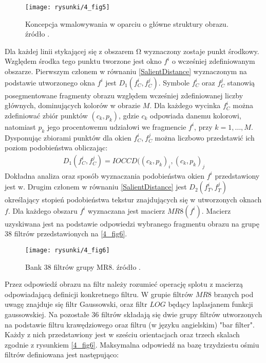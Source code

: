 \documentclass[12pt, twoside, openany]{report}
\theoremstyle{definition}
\begin{document}
\begin{figure}[!h]
	\centering
	\texttt{[image: rysunki/4\_fig5]}
	\caption{Koncepcja wmalowywania w oparciu o główne struktury obrazu. źródło \cite{StructurePropagationManual}.}
	\label{4_fig5} 
\end{figure}
Dla każdej linii stykającej się z obszarem $\mathrm{\Omega }$ wyznaczony zostaje punkt środkowy. Względem środka tego punktu tworzone jest okno  $f^i$ o wcześniej zdefiniowanym obszarze. Pierwszym członem w równaniu \eqref{SalientDistance} wyznaczonym na podstawie utworzonego okna $f^i$ jest $D_1\left(f^i_C,f^j_C\right)$. Symbole $f^i_C$ oraz $f^j_C$ stanowią posegmentowane fragmenty obrazu względem wcześniej zdefiniowanej liczby głównych, dominujących kolorów w obrazie $M$. Dla każdego wycinka $f^i_C$ można zdefiniować zbiór punktów $(c_k,p_k)$, gdzie $c_k$ odpowiada danemu kolorowi, natomiast $p_k$ jego procentowemu udziałowi we fragmencie $f^i$, przy $k=1,\dots ,M$. Dysponując zbiorami punktów dla okien $f^i_C$,$\ f^j_C$ można liczbowo przedstawić ich poziom podobieństwa obliczając: 
\begin{align}
D_1\left(f^i_C,f^j_C\right)=IOCCD({\left(c_k,p_k\right)}_i,{\left(c_k,p_k\right)}_j
\label{colDistance}
\end{align}
Dokładna analiza oraz sposób wyznaczania podobieństwa okien $f^i$ przedstawiony jest w\cite{chen2005adaptive}.
Drugim członem w równaniu \eqref{SalientDistance} jest $D_2\left(f^i_T,f^j_T\right)$ określający stopień podobieństwa tekstur znajdujących się w utworzonych oknach $f$. Dla każdego obszaru $f^i$ wyznaczana jest macierz $MR8(f^i)$. Macierz uzyskiwana jest na podstawie odpowiedzi wybranego fragmentu obrazu na grupę 38 filtrów przedstawionych na \autoref{4_fig6}.
\begin{figure}[!h]
	\centering
	\texttt{[image: rysunki/4\_fig6]}
	\caption{Bank 38 filtrów grupy MR8. źródło \cite{varma2009statistical}.}
\label{4_fig6}
\end{figure}
Przez odpowiedź obrazu na filtr należy rozumieć operację splotu z macierzą odpowiadającą definicji konkretnego filtru. W grupie filtrów $MR8$ branych pod uwagę znajduje się filtr Gaussowski, oraz filtr $LOG$ będący laplasjanem funkcji gaussowskiej. Na pozostałe 36 filtrów składają się dwie grupy filtrów utworzonych na podstawie filtru krawędziowego oraz filtru (w języku angielskim) "bar filter". Każdy z nich przedstawiony jest w sześciu orientacjach oraz trzech skalach zgodnie z rysunkiem \autoref{4_fig6}. Maksymalna odpowiedź na bazę trzydziestu ośmiu filtrów definiowana jest następująco:
\end{document}
